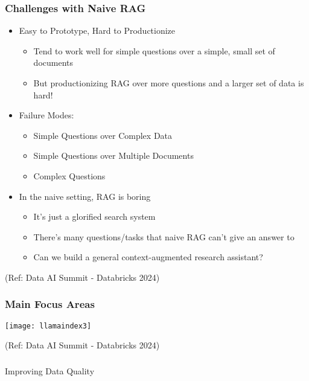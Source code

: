 \begin{frame}[fragile]\frametitle{Challenges with Naive RAG}


\begin{itemize}
\item Easy to Prototype, Hard to Productionize
	\begin{itemize}
	\item Tend to work well for simple questions over a simple, small set of documents
	\item But productionizing RAG over more questions and a larger set of data is hard!
	\end{itemize}	
\item Failure Modes:
	\begin{itemize}
	\item Simple Questions over Complex Data
	\item Simple Questions over Multiple Documents
	\item Complex Questions 
	\end{itemize}	
\item In the naive setting, RAG is boring
	\begin{itemize}
	\item It's just a glorified search system
	\item There's many questions/tasks that naive RAG can’t give an answer to
	\item Can we build a general context-augmented research assistant?
	\end{itemize}		
\end{itemize}	

{\tiny (Ref: Data AI Summit - Databricks 2024)}

\end{frame}

\begin{frame}[fragile]\frametitle{Main Focus Areas}

\begin{center}
\texttt{[image: llamaindex3]}

{\tiny (Ref: Data AI Summit - Databricks 2024)}
\end{center}
\end{frame}

\begin{frame}[fragile]\frametitle{}
\begin{center}
{\Large Improving Data Quality}
\end{center}
\end{frame}

